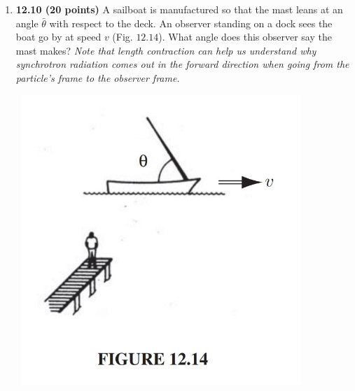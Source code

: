 \documentclass[fleqn]{article}
\begin{document}
\begin{enumerate}
    \item \textbf{12.10 (20 points)} A sailboat is manufactured so that the mast leans at an angle $\bar{\theta}$ with
    respect to the deck. An observer standing on a dock sees the boat go by at speed $v$
    (Fig. $12.14$). What angle does this observer say the mast makes?
    \emph{Note that length contraction can help us understand why synchrotron radiation comes out in the 
    forward direction when going from the particle's frame to the observer frame.}
    \begin{center}
      \includegraphics[height=11cm, width=11cm]{1214.JPG}
    \end{center}


  \end{enumerate}
\end{document}
